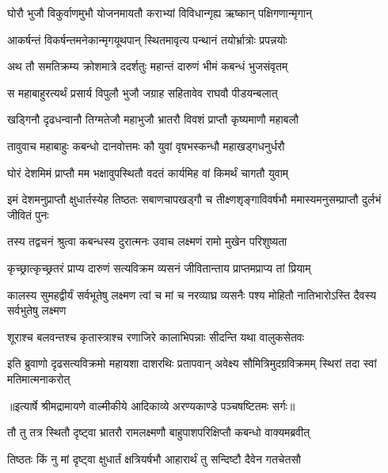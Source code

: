 \twolineshloka
{घोरौ भुजौ विकुर्वाणमुभौ योजनमायतौ}
{कराभ्यां विविधान्गृह्य ऋष्कान् पक्षिगणान्मृगान्} %

\twolineshloka
{आकर्षन्तं विकर्षन्तमनेकान्मृगयूथपान्}
{स्थितमावृत्य पन्थानं तयोर्भ्रात्रोः प्रपन्नयोः} %

\twolineshloka
{अथ तौ समतिक्रम्य क्रोशमात्रे ददर्शतुः}
{महान्तं दारुणं भीमं कबन्धं भुजसंवृतम्} %

\twolineshloka
{स महाबाहुरत्यर्थं प्रसार्य विपुलौ भुजौ}
{जग्राह सहितावेव राघवौ पीडयन्बलात्} %

\twolineshloka
{खड्गिनौ दृढधन्वानौ तिग्मतेजौ महाभुजौ}
{भ्रातरौ विवशं प्राप्तौ कृष्यमाणौ महाबलौ} %

\twolineshloka
{तावुवाच महाबाहुः कबन्धो दानवोत्तमः}
{कौ युवां वृषभस्कन्धौ महाखड्गधनुर्धरौ} %

\twolineshloka
{घोरं देशमिमं प्राप्तौ मम भक्षावुपस्थितौ}
{वदतं कार्यमिह वां किमर्थं चागतौ युवाम्} %

\threelineshloka
{इमं देशमनुप्राप्तौ क्षुधार्तस्येह तिष्ठतः}
{सबाणचापखड्गौ च तीक्ष्णशृङ्गाविवर्षभौ}
{ममास्यमनुसम्प्राप्तौ दुर्लभं जीवितं पुनः} %

\twolineshloka
{तस्य तद्वचनं श्रुत्वा कबन्धस्य दुरात्मनः}
{उवाच लक्ष्मणं रामो मुखेन परिशुष्यता} %

\twolineshloka
{कृच्छ्रात्कृच्छ्रतरं प्राप्य दारुणं सत्यविक्रम}
{व्यसनं जीवितान्ताय प्राप्तमप्राप्य तां प्रियाम्} %

\threelineshloka
{कालस्य सुमहद्वीर्यं सर्वभूतेषु लक्ष्मण}
{त्वां च मां च नरव्याघ्र व्यसनैः पश्य मोहितौ}
{नातिभारोऽस्ति दैवस्य सर्वभुतेषु लक्ष्मण} %

\twolineshloka
{शूराश्च बलवन्तश्च कृतास्त्राश्च रणाजिरे}
{कालाभिपन्नाः सीदन्ति यथा वालुकसेतवः} %

\fourlineindentedshloka
{इति ब्रुवाणो दृढसत्यविक्रमो}
{महायशा दाशरथिः प्रतापवान्}
{अवेक्ष्य सौमित्रिमुदग्रविक्रमम्}
{स्थिरां तदा स्वां मतिमात्मनाकरोत्} %


{॥इत्यार्षे श्रीमद्रामायणे वाल्मीकीये आदिकाव्ये अरण्यकाण्डे पञ्चषष्टितमः सर्गः॥}


\twolineshloka
{तौ तु तत्र स्थितौ दृष्ट्वा भ्रातरौ रामलक्ष्मणौ}
{बाहुपाशपरिक्षिप्तौ कबन्धो वाक्यमब्रवीत्} %

\twolineshloka
{तिष्ठतः किं नु मां दृष्ट्वा क्षुधार्तं क्षत्रियर्षभौ}
{आहारार्थं तु सन्दिष्टौ दैवेन गतचेतसौ} %

